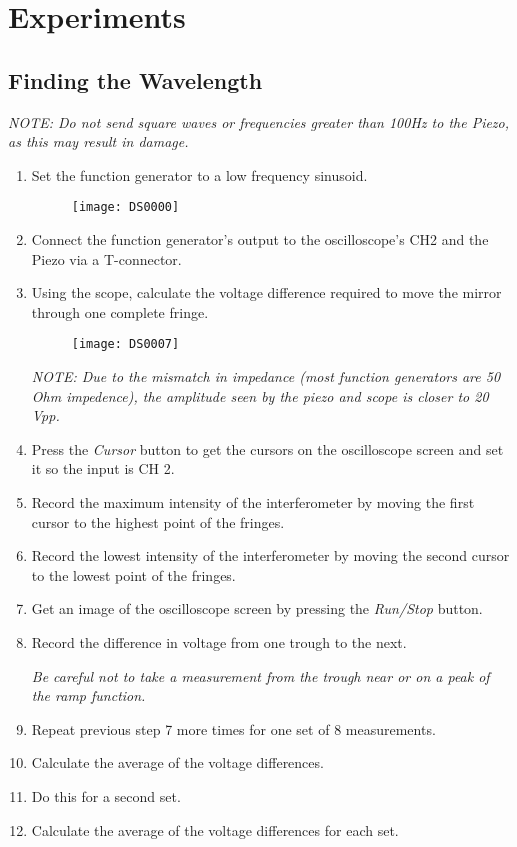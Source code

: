 
\section{Experiments}
	\subsection{Finding the Wavelength}

\emph{NOTE: Do not send square waves or frequencies greater than 100Hz to the
Piezo, as this may result in damage.}

\begin{enumerate}
 	\item Set the function generator to a low frequency sinusoid.
		\begin{figure}[ht!]
		\centering
		\texttt{[image: DS0000]}
		\end{figure}
    \item Connect the function generator's output to the oscilloscope's CH2 and
    the Piezo via a T-connector.
    \item Using the scope, calculate the voltage difference required to move the
    mirror through one complete fringe.
		\begin{figure}[ht!]
		\centering
		\texttt{[image: DS0007]}
		\end{figure}

    \emph{NOTE: Due to the mismatch in impedance (most function generators are
    50 Ohm impedence), the amplitude seen by the piezo and scope is closer to 20
    Vpp.}
	
    \item Press the \emph{Cursor} button to get the cursors on the oscilloscope
    screen and set it so the input is CH 2.
    \item Record the maximum intensity of the interferometer by moving the first
    cursor to the highest point of the fringes.
    \item Record the lowest intensity of the interferometer by moving the second
    cursor to the lowest point of the fringes.
    \item Get an image of the oscilloscope screen by pressing the
    \emph{Run/Stop} button. 
	\item Record the difference in voltage from one trough to the next. 
	
    \emph{Be careful not to take a measurement from the trough near or on a peak
    of the ramp function.}
	
	\item Repeat previous step 7 more times for one set of 8 measurements. 
	\item Calculate the average of the voltage differences.
	\item Do this for a second set.
	\item Calculate the average of the voltage differences for each set.
\end{enumerate}



